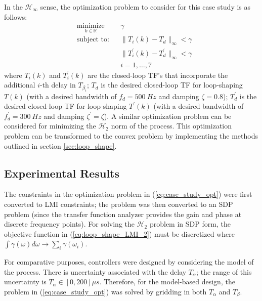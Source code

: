 \documentclass[a4paper, 10pt, conference]{ieeeconf}
\begin{document}
In the $\mathcal{H}_{\infty}$ sense, the optimization problem to consider for this case study is as follows:
 \begin{equation} \label{eq:case_study_opt}
\begin{aligned}
& \underset{ k \in \mathbb{R}}{\text{minimize}}
& & \gamma  \\
& \text{subject to:} & & \|T_i(k)-T_d\|_{\infty}< \gamma \\
& &  &\|T_i^{\prime}(k)-T_d^{\prime}\|_{\infty}< \gamma \\ 
& & & i = 1,\ldots,7
\end{aligned}
\end{equation}
where $T_i(k)$ and $T_i^{\prime}(k)$ are the closed-loop TF's that incorporate the additional $i$-th delay in $T_{\beta_i}$; $T_d$ is the desired closed-loop TF for loop-shaping $T(k)$ (with a desired bandwidth of $f_d = 500 \: Hz$ and damping $\zeta = 0.8$); $T_d^{\prime}$ is the desired closed-loop TF for loop-shaping $T^{\prime}(k)$ (with a desired bandwidth of $f_d^{\prime} = 300 \: Hz$ and damping $\zeta^{\prime} = \zeta$). A similar optimization problem can be considered for minimizing the $\mathcal{H}_2$ norm of the process. This optimization problem can be transformed to the convex problem by implementing the methods outlined in section \ref{sec:loop_shape}. 
\subsection{Experimental Results}
The constraints in the optimization problem in (\ref{eq:case_study_opt}) were first converted to LMI constraints; the problem was then converted to an SDP problem (since the transfer function analyzer provides the gain and phase at discrete frequency points). For solving the $\mathcal{H}_2$ problem in SDP form, the objective function in (\ref{eq:loop_shape_LMI_2}) must be discretized where $\int \gamma(\omega) d\omega \rightarrow \sum_i \gamma(\omega_i)$.

For comparative purposes, controllers were designed by considering the model of the process. There is uncertainty associated with the delay $T_\alpha$; the range of this uncertainty is $T_\alpha \in [0,200]\mu s$. Therefore, for the model-based design, the problem in (\ref{eq:case_study_opt}) was solved by gridding in both $T_\alpha$ and $T_\beta$.
\end{document}
